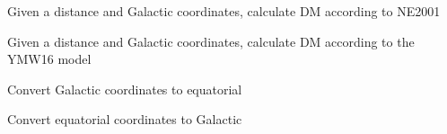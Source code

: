 \documentclass[letterpaper,10pt,english]{sphinxmanual}
\begin{document}

\begin{fulllineitems}
\label{\detokenize{module-level-docs:galacticops.ne2001_dist_to_dm}}
\pysigstartsignatures
\pysiglinewithargsret
{}
{\sphinxparamcomma {}\sphinxparamcomma {}}
{}
\pysigstopsignatures
\sphinxAtStartPar
Given a distance and Galactic coordinates, calculate DM according to NE2001

\end{fulllineitems}


\begin{fulllineitems}
\label{\detokenize{module-level-docs:galacticops.ymw16_dist_to_dm}}
\pysigstartsignatures
\pysiglinewithargsret
{}
{\sphinxparamcomma {}\sphinxparamcomma {}}
{}
\pysigstopsignatures
\sphinxAtStartPar
Given a distance and Galactic coordinates, calculate DM according to the YMW16 model

\end{fulllineitems}


\begin{fulllineitems}
\label{\detokenize{module-level-docs:galacticops.lb_to_radec}}
\pysigstartsignatures
\pysiglinewithargsret
{}
{\sphinxparamcomma {}}
{}
\pysigstopsignatures
\sphinxAtStartPar
Convert Galactic coordinates to equatorial

\end{fulllineitems}


\begin{fulllineitems}
\label{\detokenize{module-level-docs:galacticops.ra_dec_to_lb}}
\pysigstartsignatures
\pysiglinewithargsret
{}
{\sphinxparamcomma {}}
{}
\pysigstopsignatures
\sphinxAtStartPar
Convert equatorial coordinates to Galactic

\end{fulllineitems}
\end{document}
